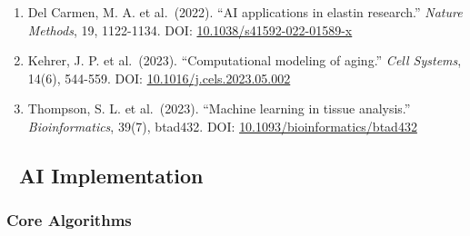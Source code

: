 \begin{enumerate}
\def\labelenumi{\arabic{enumi}.}
\item
  Del Carmen, M. A. et al.~(2022). ``AI applications in elastin
  research.'' \emph{Nature Methods}, 19, 1122-1134. DOI:
  \href{https://doi.org/10.1038/s41592-022-01589-x}{10.1038/s41592-022-01589-x}
\item
  Kehrer, J. P. et al.~(2023). ``Computational modeling of aging.''
  \emph{Cell Systems}, 14(6), 544-559. DOI:
  \href{https://doi.org/10.1016/j.cels.2023.05.002}{10.1016/j.cels.2023.05.002}
\item
  Thompson, S. L. et al.~(2023). ``Machine learning in tissue
  analysis.'' \emph{Bioinformatics}, 39(7), btad432. DOI:
  \href{https://doi.org/10.1093/bioinformatics/btad432}{10.1093/bioinformatics/btad432}
\end{enumerate}

\subsection{🤖 AI Implementation}\label{ai-implementation-1}

\subsubsection{Core Algorithms}\label{core-algorithms}

\begin{Shaded}
\begin{Highlighting}[]
     \NormalTok{(}\NormalTok{):}
        \OperatorTok{=}
        \OperatorTok{=}
        \OperatorTok{=}
        \OperatorTok{=}

     \OperatorTok{{-}\textgreater{}}
\OperatorTok{=} 
\NormalTok{        )}
         
\end{Highlighting}
\end{Shaded}

